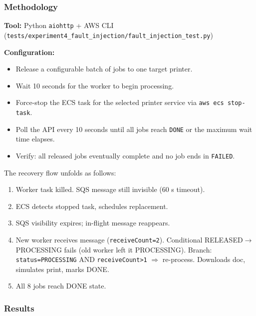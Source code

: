 \documentclass[11pt,letterpaper]{article}
\newcommand{\code}[1]{\texttt{\small #1}}
\begin{document}
\subsubsection{Methodology}
\textbf{Tool:} Python \code{aiohttp} + AWS CLI (\code{tests/experiment4\_fault\_injection/fault\_injection\_test.py})

\textbf{Configuration:}
\begin{itemize}[noitemsep]
  \item Release a configurable batch of jobs to one target printer.
  \item Wait 10 seconds for the worker to begin processing.
  \item Force-stop the ECS task for the selected printer service via \code{aws ecs stop-task}.
  \item Poll the API every 10 seconds until all jobs reach \texttt{DONE} or the maximum wait time elapses.
  \item Verify: all released jobs eventually complete and no job ends in \texttt{FAILED}.
\end{itemize}

The recovery flow unfolds as follows:
\begin{enumerate}[noitemsep,label=\texttt{T+\arabic*.}]
  \item[$T_0$:] Worker task killed. SQS message still invisible (60 s timeout).
  \item[$T_{30}$:] ECS detects stopped task, schedules replacement.
  \item[$T_{60}$:] SQS visibility expires; in-flight message reappears.
  \item[$T_{60-80}$:] New worker receives message (\code{receiveCount=2}). Conditional RELEASED$\to$PROCESSING fails (old worker left it PROCESSING). Branch: \code{status=PROCESSING} AND \code{receiveCount>1} $\Rightarrow$ re-process. Downloads doc, simulates print, marks DONE.
  \item[$T_{140.5}$:] All 8 jobs reach DONE state.
\end{enumerate}

\subsubsection{Results}
\end{document}
